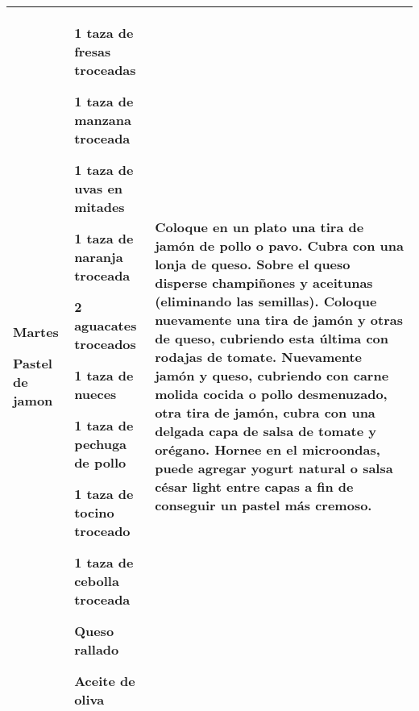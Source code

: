 \documentclass[menu.tex]{subfiles}
\begin{document}
\begin{tabular} {p{3cm} p{4.5cm} p{9cm}}
\pbox{20cm}
{
    \rule{0pt}{3ex}\begin{large}\textbf{Martes}\end{large}\\ 
    \rule{0pt}{2ex}Pastel de jamon
}& 
\vspace{-0.5cm}            
\begin{compactitem} 
    \begin{scriptsize}
        \item 1 taza de fresas troceadas
        \item 1 taza de manzana troceada
        \item 1 taza de uvas en mitades
        \item 1 taza de naranja troceada
        \item 2 aguacates troceados
        \item 1 taza de nueces
        \item 1 taza de pechuga de pollo
        \item 1 taza de tocino troceado
        \item 1 taza de cebolla troceada
        \item Queso rallado
        \item Aceite de oliva               
    \end{scriptsize}
\end{compactitem}&
\vspace{-0.5cm}
Coloque en un plato una tira de jamón de pollo o pavo. Cubra con una lonja de queso. Sobre el queso disperse champiñones y aceitunas (eliminando las semillas). Coloque nuevamente una tira de jamón y otras de queso, cubriendo esta última con rodajas de tomate. Nuevamente jamón y queso, cubriendo con carne molida cocida o pollo desmenuzado, otra tira de jamón, cubra con una delgada capa de salsa de tomate y orégano. Hornee en el microondas, puede agregar yogurt natural o salsa césar light entre capas a fin de conseguir un pastel más cremoso.\\
\hline


\end{tabular}
\end{document}
